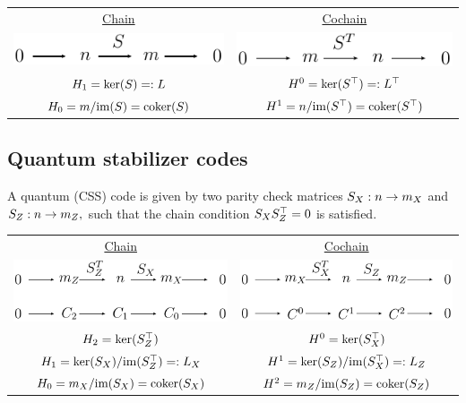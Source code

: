 \begin{center}
\begin{tabular}{ c c }
\underline{Chain}           &   \underline{Cochain}       \\[8pt]
\includegraphics{classchain.pdf}   &  \includegraphics{classcochain.pdf} \\[8pt]
$\H_1=\ker(\S)=:L$  &   $\H^0=\ker(\S^\top) =: L^\top $   \\[8pt]
$\H_0=m/{\im(\S)}=\coker(\S)$ &     $\H^1=n/{\im(\S^\top)}=\coker(\S^\top)$     \\[8pt]
\end{tabular}
\end{center}


\subsection{Quantum stabilizer codes}


A quantum (CSS) code is given by two parity
check matrices $\S_X:n\to m_X$ and $\S_Z:n\to m_Z,$
such that the chain condition $ \S_X \S_Z^\top = 0$
is satisfied.


\begin{center}
\begin{tabular}{ c c }
\underline{Chain}           &   \underline{Cochain}       \\[8pt]
\includegraphics{quchain.pdf}     &  \includegraphics{qucochain.pdf} \\[8pt]
$\H_2=\ker(\S_Z^\top)$                &   $\H^0=\ker(\S_X^\top) $   \\[8pt]
$\H_1=\ker(\S_X)/\im(\S_Z^\top)=:L_X$  &   $\H^1=\ker(\S_Z)/\im(\S_X^\top) =: L_Z $   \\[8pt]
$\H_0=m_X/{\im(\S_X)}=\coker(\S_X)$             &   $\H^2=m_Z/{\im(\S_Z)}=\coker(\S_Z)$     \\[8pt]
\end{tabular}
\end{center}


